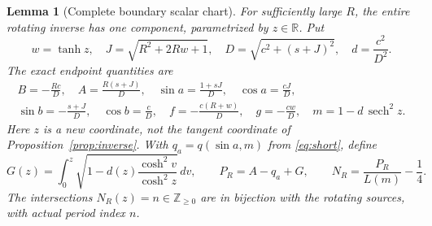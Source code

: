 \documentclass[11pt,a4paper]{article}
\newtheorem{lemma}[theorem]{Lemma}
\theoremstyle{remark}\newtheorem{remark}[theorem]{Remark}
\begin{document}
\begin{lemma}[Complete boundary scalar chart]\label{lem:boundary-chart}
For sufficiently large $R$, the entire rotating inverse has one
component, parametrized by $z\in\mathbb R$. Put
\begin{equation}\label{eq:boundary-aux}
 w=\tanh z,\quad J=\sqrt{R^2+2Rw+1},\quad
 D=\sqrt{c^2+(s+J)^2},\quad d=\frac{c^2}{D^2}.
\end{equation}
The exact endpoint quantities are
\begin{equation}\label{eq:boundary-chart}
 \begin{gathered}
 B=-\frac{Rc}{D},\quad A=\frac{R(s+J)}D,\quad
 \sin a=\frac{1+sJ}D,\quad\cos a=\frac{cJ}D,\\
 \sin b=-\frac{s+J}D,\quad\cos b=\frac cD,\quad
 f=-\frac{c(R+w)}D,\quad g=-\frac{cw}D,\quad
 m=1-d\,\operatorname{sech}^2z.
 \end{gathered}
\end{equation}
Here $z$ is a new coordinate, not the tangent coordinate of
Proposition~\ref{prop:inverse}. With $q_a=q(\sin a,m)$ from
\eqref{eq:short}, define
\begin{equation}\label{eq:boundary-G}
 G(z)=\int_0^z
 \sqrt{1-d(z)\frac{\cosh^2v}{\cosh^2z}}\,dv,\qquad
 P_R=A-q_a+G,\qquad N_R=\frac{P_R}{L(m)}-\frac14.
\end{equation}
The intersections $N_R(z)=n\in\mathbb Z_{\ge0}$ are in bijection with
the rotating sources, with actual period index $n$.
\end{lemma}
\end{document}
